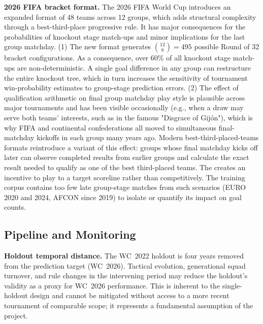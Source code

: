 \documentclass[conference]{IEEEtran}
\begin{document}
\textbf{2026 FIFA bracket format.}
The 2026 FIFA World Cup introduces an expanded format of 48 teams across 12 groups, which adds
structural complexity through a best-third-place progressive rule. It has major consequences for the 
probabilities of knockout stage match-ups and minor implications for the last group matchday.
(1) The new format generates $\binom{12}{8} = 495$ possible Round of 32 bracket configurations. As a 
consequence, over 60\% of all knockout stage match-ups are non-deterministic. A single goal difference 
in any group can restructure the entire knockout tree, which in turn increases the sensitivity of 
tournament win-probability estimates to group-stage prediction errors.
(2) The effect of qualification arithmetic on final group matchday play style is plausible across major 
tournaments and has been visible occasionally (e.g., when a draw may serve both teams' interests, such 
as in the famous "Disgrace of Gijón"), which is why FIFA and continental confederations all moved 
to simultaneous final-matchday kickoffs in each group many years ago. 
Modern best-third-placed-teams formats reintroduce a variant of this effect: groups whose final matchday 
kicks off later can observe completed results from earlier groups and calculate the exact result needed 
to qualify as one of the best third-placed teams. The creates an incentive to play to a target scoreline 
rather than competitively.
The training corpus contains too few  late group-stage matches from such scenarios (EURO 2020 and 2024, 
AFCON since 2019) to isolate or quantify its impact on goal counts.

\subsection{Pipeline and Monitoring}

\textbf{Holdout temporal distance.}
The WC~2022 holdout is four years removed from the prediction target
(WC~2026).  Tactical evolution, generational squad turnover, and rule
changes in the intervening period may reduce the holdout's validity as a
proxy for WC~2026 performance.  This is inherent to the single-holdout
design and cannot be mitigated without access to a more recent tournament of
comparable scope; it represents a fundamental assumption of the project.
\end{document}
